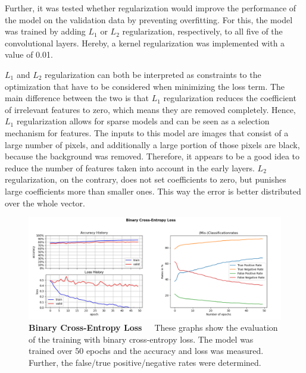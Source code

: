 Further, it was tested whether regularization would improve the performance of the model on the validation data by preventing overfitting. For this, the model was trained by adding \(L_1\) or \(L_2\) regularization, respectively, to all five of the convolutional layers. Hereby, a kernel regularization was implemented with a value of 0.01.

\(L_1\) and \(L_2\) regularization can both be interpreted as constraints to the optimization that have to be considered when minimizing the loss term. The main difference between the two is that \(L_1\) regularization reduces the coefficient of irrelevant features to zero, which means they are removed completely. Hence, \(L_1\) regularization allows for sparse models and can be seen as a selection mechanism for features. The inputs to this model are images that consist of a large number of pixels, and additionally a large portion of those pixels are black, because the background was removed. Therefore, it appears to be a good idea to reduce the number of features taken into account in the early layers. \(L_2\) regularization, on the contrary, does not set coefficients to zero, but punishes large coefficients more than smaller ones. This way the error is better distributed over the whole vector.

\begin{figure}[!htb]
    \centering
    \includegraphics[scale=0.37]{Figures/chapter04/multilabel_crossentropy.png}
    \decoRule
    \caption[Multi-Label Binary Cross-Entropy Loss]{\textbf{Binary Cross-Entropy Loss}~~~These graphs show the evaluation of the training with binary cross-entropy loss. The model was trained over 50 epochs and the accuracy and loss was measured. Further, the false/true positive/negative rates were determined.}
    \label{fig:MultilabelCrossentropy}
\end{figure}

